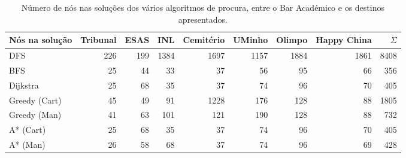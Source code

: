 \documentclass[12pt, a4paper]{article}
\begin{document}
\begin{table}[H]
    \small

    \begin{adjustwidth}{-1.5cm}{-1.5cm}
        \begin{center}
            \begin{tabular}{|l|r|r|r|r|r|r|r|r|}
                \hline
                    Nós na solução &
                    Tribunal       &
                    ESAS           &
                    INL            &
                    Cemitério      &
                    UMinho         &
                    Olimpo         &
                    Happy China    &
                    $\Sigma$       \\

                \hline
                DFS & 226 & 199 & 1384 & 1697 & 1157 & 1884 & 1861 & 8408 \\
                \hline
                BFS & 25 & 44 & 33 & 37 & 56 & 95 & 66 & 356 \\
                \hline
                Dijkstra & 25 & 68 & 35 & 37 & 74 & 96 & 70 & 405 \\
                \hline
                Greedy (Cart) & 45 & 49 & 91 & 1228 & 176 & 128 & 88 & 1805 \\
                \hline
                Greedy (Man) & 41 & 63 & 101 & 121 & 190 & 128 & 88 & 732 \\
                \hline
                A* (Cart) & 25 & 68 & 35 & 37 & 74 & 96 & 70 & 405 \\
                \hline
                A* (Man) & 26 & 58 & 68 & 37 & 74 & 96 & 69 & 428 \\
                \hline
            \end{tabular}
        \end{center}
    \end{adjustwidth}

    \caption{
        Número de nós nas soluções dos vários algoritmos de procura, entre o Bar Académico e os
        destinos apresentados.
    }
\end{table}
\end{document}
